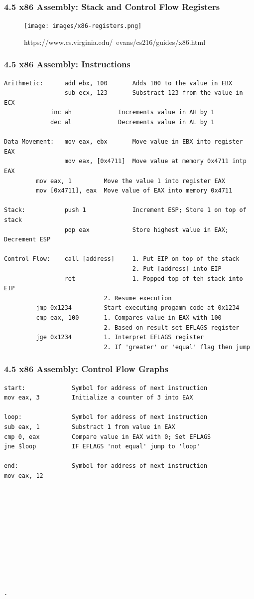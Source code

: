 \begin{frame}[fragile]
  \frametitle{4.5 x86 Assembly: Stack and Control Flow Registers}
    \begin{figure}
        \texttt{[image: images/x86-registers.png]}
        \captionsetup{labelformat=empty,labelsep=none}
        \caption[]{\tiny https://www.cs.virginia.edu/~evans/cs216/guides/x86.html}
    \end{figure}
\end{frame}


\begin{frame}[fragile]
  \frametitle{4.5 x86 Assembly: Instructions}
  \begin{lstlisting}[basicstyle=\tiny]
Arithmetic:      add ebx, 100       Adds 100 to the value in EBX
                 sub ecx, 123       Substract 123 from the value in ECX
	         inc ah             Increments value in AH by 1
	         dec al             Decrements value in AL by 1

Data Movement:   mov eax, ebx       Move value in EBX into register EAX
                 mov eax, [0x4711]  Move value at memory 0x4711 intp EAX
		 mov eax, 1         Move the value 1 into register EAX
		 mov [0x4711], eax  Move value of EAX into memory 0x4711

Stack:           push 1             Increment ESP; Store 1 on top of stack
                 pop eax            Store highest value in EAX; Decrement ESP

Control Flow:    call [address]     1. Put EIP on top of the stack
                                    2. Put [address] into EIP
                 ret                1. Popped top of teh stack into EIP
		                    2. Resume execution
		 jmp 0x1234         Start executing progamm code at 0x1234
		 cmp eax, 100       1. Compares value in EAX with 100
		                    2. Based on result set EFLAGS register
		 jge 0x1234         1. Interpret EFLAGS register
		                    2. If 'greater' or 'equal' flag then jump
  \end{lstlisting}
\end{frame}


\begin{frame}[fragile]
  \frametitle{4.5 x86 Assembly: Control Flow Graphs}
  \begin{lstlisting}[basicstyle=\tiny]
start:             Symbol for address of next instruction
mov eax, 3         Initialize a counter of 3 into EAX

loop:              Symbol for address of next instruction
sub eax, 1         Substract 1 from value in EAX
cmp 0, eax         Compare value in EAX with 0; Set EFLAGS
jne $loop          IF EFLAGS 'not equal' jump to 'loop'

end:               Symbol for address of next instruction
mov eax, 12











.
  \end{lstlisting}
\end{frame}


